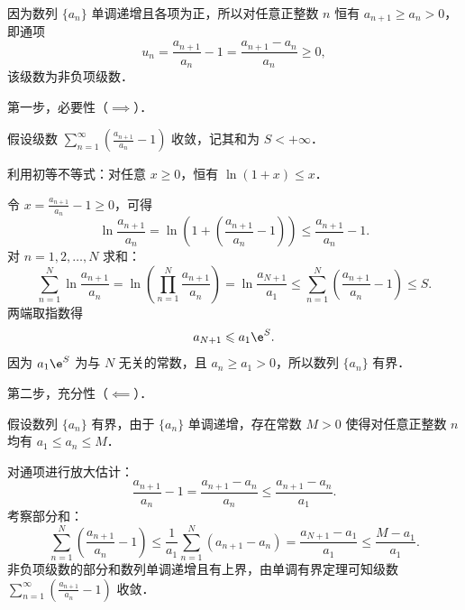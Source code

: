 \begin{myproof}
    因为数列 $\{a_n\}$ 单调递增且各项为正，所以对任意正整数 $n$ 恒有 $a_{n+1} \geqslant a_n > 0$，即通项
    \begin{equation}
        u_n = \frac{a_{n+1}}{a_n} - 1 = \frac{a_{n+1} - a_n}{a_n} \geqslant 0,
    \end{equation}
    该级数为非负项级数．

    第一步，必要性（$\implies$）．

    假设级数 $\sum_{n=1}^\infty \left(\frac{a_{n+1}}{a_n} - 1\right)$ 收敛，记其和为 $S < +\infty$．

    利用初等不等式：对任意 $x \geqslant 0$，恒有 $\ln(1 + x) \leqslant x$．

    令 $x = \frac{a_{n+1}}{a_n} - 1 \geqslant 0$，可得
    \begin{equation}
        \ln \frac{a_{n+1}}{a_n} = \ln\left( 1 + \left(\frac{a_{n+1}}{a_n} - 1\right) \right) \leqslant \frac{a_{n+1}}{a_n} - 1.
    \end{equation}
    对 $n = 1, 2, \dots, N$ 求和：
    \begin{equation}
        \sum_{n=1}^N \ln \frac{a_{n+1}}{a_n} = \ln \left( \prod_{n=1}^N \frac{a_{n+1}}{a_n} \right) = \ln \frac{a_{N+1}}{a_1} \leqslant \sum_{n=1}^N \left( \frac{a_{n+1}}{a_n} - 1 \right) \leqslant S.
    \end{equation}
    两端取指数得
    \begin{equation}
        a_{N+1} \leqslant a_1 \e^S.
    \end{equation}
    因为 $a_1 \e^S$ 为与 $N$ 无关的常数，且 $a_n \geqslant a_1 > 0$，所以数列 $\{a_n\}$ 有界．

    第二步，充分性（$\impliedby$）．

    假设数列 $\{a_n\}$ 有界，由于 $\{a_n\}$ 单调递增，存在常数 $M > 0$ 使得对任意正整数 $n$ 均有 $a_1 \leqslant a_n \leqslant M$．

    对通项进行放大估计：
    \begin{equation}
        \frac{a_{n+1}}{a_n} - 1 = \frac{a_{n+1} - a_n}{a_n} \leqslant \frac{a_{n+1} - a_n}{a_1}.
    \end{equation}
    考察部分和：
    \begin{equation}
        \sum_{n=1}^N \left( \frac{a_{n+1}}{a_n} - 1 \right) \leqslant \frac{1}{a_1} \sum_{n=1}^N (a_{n+1} - a_n) = \frac{a_{N+1} - a_1}{a_1} \leqslant \frac{M - a_1}{a_1}.
    \end{equation}
    非负项级数的部分和数列单调递增且有上界，由单调有界定理可知级数 $\sum_{n=1}^\infty \left(\frac{a_{n+1}}{a_n} - 1\right)$ 收敛．
\end{myproof}

